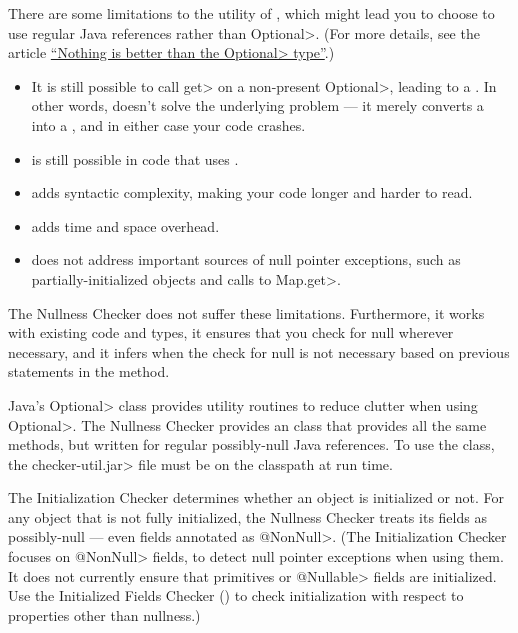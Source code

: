 There are some limitations to the utility of , which might
lead you to choose to use regular Java references rather than \<Optional>.
(For more details, see the article
\href{https://homes.cs.washington.edu/~mernst/advice/nothing-is-better-than-optional.html}{``Nothing
  is better than the \<Optional> type''}.)

\begin{itemize}
\item
  It is still possible to call \<get> on a non-present \<Optional>, leading
  to a .  In other words, 
  doesn't solve the underlying problem --- it merely converts a
   into a ,
  and in either case your code crashes.
\item
   is still possible in code that uses .
\item
   adds syntactic complexity, making your code longer and harder to
  read.
\item
   adds time and space overhead.
\item
   does not address important sources of null pointer
  exceptions, such as partially-initialized objects and calls to \<Map.get>.
\end{itemize}

The Nullness Checker does not suffer these limitations.  Furthermore, it
works with existing code and types, it ensures that you check for null
wherever necessary, and it infers when the check for null is not necessary
based on previous statements in the method.

Java's \<Optional> class provides utility routines to reduce clutter when
using \<Optional>.  The Nullness Checker provides an
 class that provides all the same methods,
but written for regular possibly-null Java references.
To use the  class, the
\<checker-util.jar> file must be on the classpath at run time.



The Initialization Checker determines whether an object is initialized or
not.  For any object that is not fully initialized, the Nullness Checker
treats its fields as possibly-null --- even fields annotated as
\<@NonNull>.
(The Initialization Checker focuses on \<@NonNull> fields, to detect null
pointer exceptions when using them.  It does not
currently ensure that primitives or \<@Nullable> fields are initialized.
Use the Initialized Fields Checker
() to check initialization with
respect to properties other than nullness.)

